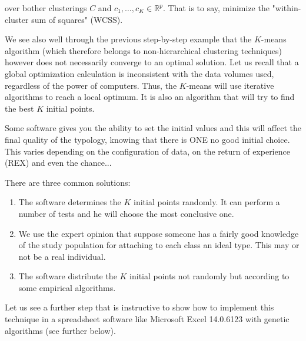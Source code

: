	over bother clusterings $C$ and $c_1,\ldots,c_K\in\mathbb{R}^p$. That is to say, minimize the "within-cluster sum of squares" (WCSS).
	
	We see also well through the previous step-by-step example that the $K$-means algorithm (which therefore belongs to non-hierarchical clustering techniques) however does not necessarily converge to an optimal solution. Let us recall that a global optimization calculation is inconsistent with the data volumes used, regardless of the power of computers. Thus, the $K$-means will use iterative algorithms to reach a local optimum. It is also an algorithm that will try to find the best $K$ initial points.

	Some software gives you the ability to set the initial values and this will affect the final quality of the typology, knowing that there is ONE no good initial choice. This varies depending on the configuration of data, on the return of experience (REX) and even the chance...
	
	There are three common solutions:
	\begin{enumerate}
		\item The software determines the $K$ initial points randomly. It can perform a number of tests and he will choose the most conclusive one.

		\item We use the expert opinion that suppose someone has a fairly good knowledge of the study population for attaching to each class an ideal type. This may or not be a real individual.

		\item The software distribute the $K$ initial points not randomly but according to some empirical algorithms.
	\end{enumerate}

	Let us see a further step that is instructive to show how to implement this technique in a spreadsheet software like Microsoft Excel 14.0.6123 with genetic algorithms (see further below).
	
